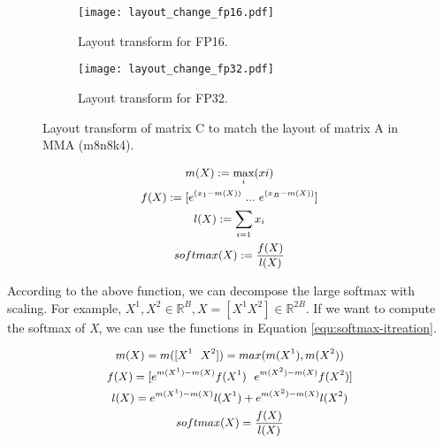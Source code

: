 \documentclass[10pt,twocolumn]{article}
\begin{document}
\begin{figure*}[htbp] \small
  \centering
    \begin{subfigure}[b]{0.5\textwidth}
        \texttt{[image: layout\_change\_fp16.pdf]}
        \vspace{3pt}
        \caption{Layout transform for FP16.}
        \label{fig:format_conversion-a}
    \end{subfigure}
    \hspace{0.0cm} %
    \begin{subfigure}[b]{0.48\textwidth}
        \texttt{[image: layout\_change\_fp32.pdf]}
        \caption{Layout transform for FP32.}
        \label{fig:format_conversion-b}
    \end{subfigure}
  \caption{Layout transform of matrix C to match the layout of matrix A in MMA (m8n8k4).}
  \label{fig:format_conversion}%
\end{figure*}


\begin{equation} \small \label{equ:softmax-normal}
\begin{gathered}
    m(X):=\max_{i}(xi)\\
    f(X):=[e^{(x_1 - m(X))}~...~e^{(x_B - m(X))}]\\
    l(X):=\sum_{i=1} x_i\\
    softmax(X) := \frac{f(X)}{l(X)}\\
\end{gathered}
\end{equation}

According to the above function, we can decompose the large softmax with scaling. 
For example, $X^1,X^2 \in \mathbb{R}^{B}, X=[X^1X^2] \in \mathbb{R}^{2B}$. 
If we want to compute the softmax of \textit{X}, we can use the functions in Equation \ref{equ:softmax-itreation}.

\begin{equation} \small \label{equ:softmax-itreation}
\begin{gathered}
    m(X)=m([X^1~~X^2])=max(m(X^1), m(X^2))\\
    f(X)=[e^{m(X^1) - m(X)}f(X^1)~~e^{m(X^2) - m(X)}f(X^2)]\\
    l(X)=e^{m(X^1) - m(X)}l(X^1) + e^{m(X^2) - m(X)}l(X^2)\\
    softmax(X)=\frac{f(X)}{l(X)}\\
\end{gathered}
\end{equation}
\end{document}
